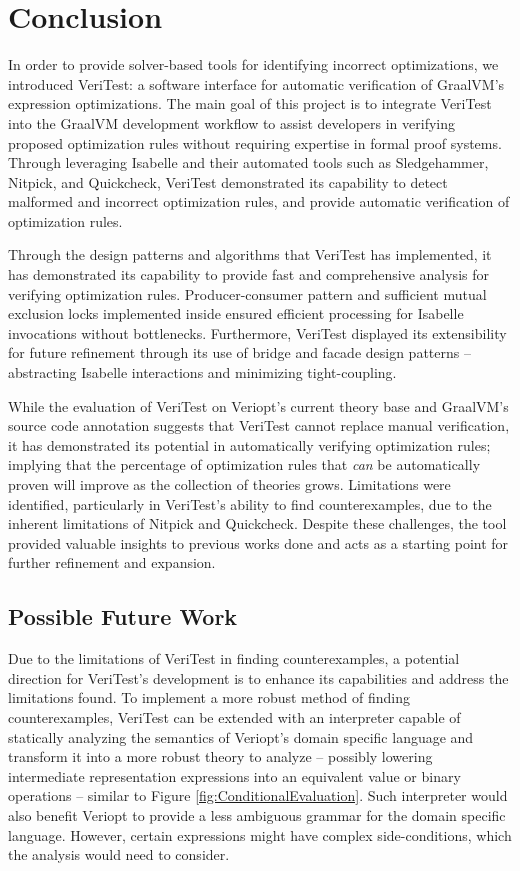 \chapter{Conclusion \label{sec:conclusion}}

In order to provide solver-based tools for identifying incorrect optimizations, we introduced VeriTest: a software interface 
for automatic verification of GraalVM's expression optimizations. The main goal of this project is to integrate VeriTest into 
the GraalVM development workflow to assist developers in verifying proposed optimization rules without requiring expertise in formal 
proof systems. Through leveraging Isabelle and their automated tools such as Sledgehammer, Nitpick, and Quickcheck, VeriTest demonstrated 
its capability to detect malformed and incorrect optimization rules, and provide automatic verification of optimization rules.

Through the design patterns and algorithms that VeriTest has implemented, it has demonstrated its capability to provide fast and comprehensive 
analysis for verifying optimization rules. Producer-consumer pattern and sufficient mutual exclusion locks implemented inside ensured efficient 
processing for Isabelle invocations without bottlenecks. Furthermore, VeriTest displayed its extensibility for future refinement through its use of 
bridge and facade design patterns -- abstracting Isabelle interactions and minimizing tight-coupling.

While the evaluation of VeriTest on Veriopt's current theory base and GraalVM's source code annotation suggests that VeriTest cannot replace 
manual verification, it has demonstrated its potential in automatically verifying optimization rules; implying that the percentage of 
optimization rules that \emph{can} be automatically proven will improve as the collection of theories grows. Limitations were identified, 
particularly in VeriTest's ability to find counterexamples, due to the inherent limitations of Nitpick and Quickcheck. Despite these challenges, 
the tool provided valuable insights to previous works done and acts as a starting point for further refinement and expansion.

\section{Possible Future Work \label{sec:future_work}}

Due to the limitations of VeriTest in finding counterexamples, a potential direction for VeriTest's development is to enhance 
its capabilities and address the limitations found. To implement a more robust method of finding counterexamples, VeriTest can be 
extended with an interpreter capable of statically analyzing the semantics of Veriopt's domain specific language and transform it into a more 
robust theory to analyze -- possibly lowering intermediate representation expressions into an equivalent value or binary operations -- 
similar to Figure \ref{fig:ConditionalEvaluation}. Such interpreter would also benefit Veriopt to provide a less ambiguous grammar for the 
domain specific language. However, certain expressions might have complex side-conditions, which the analysis would need to 
consider.


